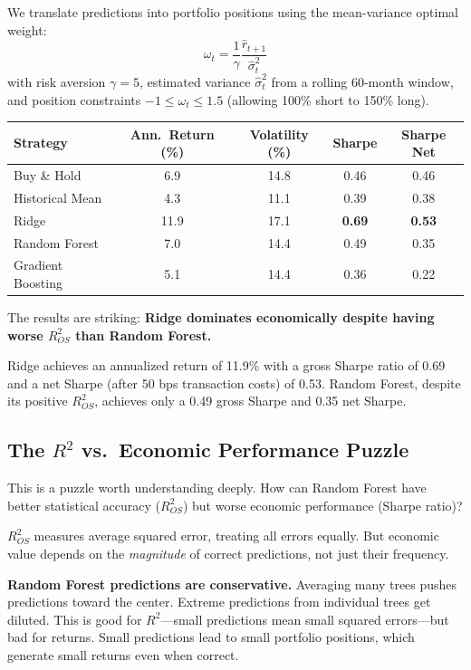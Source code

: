\documentclass[11pt,a4paper]{article}
\begin{document}
We translate predictions into portfolio positions using the mean-variance optimal weight:
\[
\omega_t = \frac{1}{\gamma}\frac{\widehat{r}_{t+1}}{\widehat{\sigma}^2_t}
\]
with risk aversion $\gamma = 5$, estimated variance $\widehat{\sigma}^2_t$ from a rolling 60-month window, and position constraints $-1 \leq \omega_t \leq 1.5$ (allowing 100\% short to 150\% long).

\begin{center}
\begin{tabular}{lcccc}
\toprule
\textbf{Strategy} & \textbf{Ann.\ Return (\%)} & \textbf{Volatility (\%)} & \textbf{Sharpe} & \textbf{Sharpe Net} \\
\midrule
Buy \& Hold & 6.9 & 14.8 & 0.46 & 0.46 \\
Historical Mean & 4.3 & 11.1 & 0.39 & 0.38 \\
\midrule
Ridge & 11.9 & 17.1 & \textbf{0.69} & \textbf{0.53} \\
Random Forest & 7.0 & 14.4 & 0.49 & 0.35 \\
Gradient Boosting & 5.1 & 14.4 & 0.36 & 0.22 \\
\bottomrule
\end{tabular}
\end{center}

The results are striking: \textbf{Ridge dominates economically despite having worse $R^2_{OS}$ than Random Forest.}

Ridge achieves an annualized return of 11.9\% with a gross Sharpe ratio of 0.69 and a net Sharpe (after 50 bps transaction costs) of 0.53. Random Forest, despite its positive $R^2_{OS}$, achieves only a 0.49 gross Sharpe and 0.35 net Sharpe.

\subsection{The $R^2$ vs.\ Economic Performance Puzzle}

This is a puzzle worth understanding deeply. How can Random Forest have better statistical accuracy ($R^2_{OS}$) but worse economic performance (Sharpe ratio)?

$R^2_{OS}$ measures average squared error, treating all errors equally. But economic value depends on the \emph{magnitude} of correct predictions, not just their frequency.

\textbf{Random Forest predictions are conservative.} Averaging many trees pushes predictions toward the center. Extreme predictions from individual trees get diluted. This is good for $R^2$---small predictions mean small squared errors---but bad for returns. Small predictions lead to small portfolio positions, which generate small returns even when correct.
\end{document}

